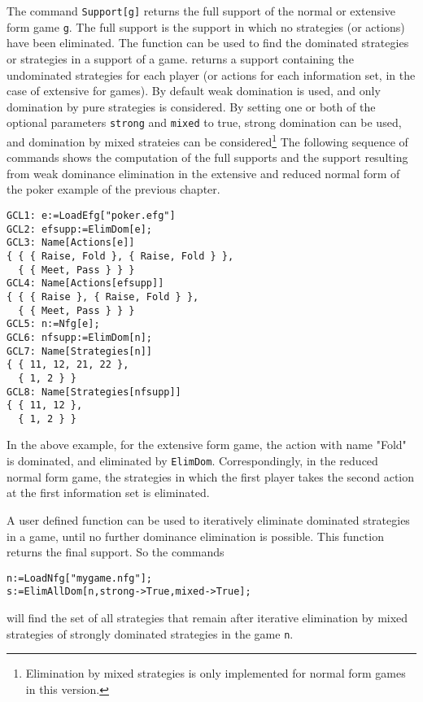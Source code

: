 The command \verb+Support[g]+ returns the full support
of the normal or extensive form game \verb+g+.  The full support is
the support in which no strategies (or actions) have been eliminated.
The function  can be used to find the dominated
strategies or strategies in a support of a game.  
returns a support containing the undominated strategies for each
player (or actions for each information set, in the case of extensive
for games).  By default weak domination is used, and only domination
by pure strategies is considered. By setting one or both of the
optional parameters \verb+strong+ and \verb+mixed+ to true, strong
domination can be used, and domination by mixed strateies can be
considered\footnote{Elimination by mixed strategies is only
implemented for normal form games in this version.}  The following
sequence of commands shows the computation of the full supports and
the support resulting from weak dominance elimination in the extensive
and reduced normal form of the poker example of the previous chapter.

\begin{verbatim}
GCL1: e:=LoadEfg["poker.efg"]
GCL2: efsupp:=ElimDom[e];
GCL3: Name[Actions[e]]
{ { { Raise, Fold }, { Raise, Fold } },
  { { Meet, Pass } } }
GCL4: Name[Actions[efsupp]]
{ { { Raise }, { Raise, Fold } },
  { { Meet, Pass } } }
GCL5: n:=Nfg[e];
GCL6: nfsupp:=ElimDom[n];
GCL7: Name[Strategies[n]]
{ { 11, 12, 21, 22 },
  { 1, 2 } }
GCL8: Name[Strategies[nfsupp]]
{ { 11, 12 },
  { 1, 2 } }
\end{verbatim}

In the above example, for the extensive form game, the action with
name "Fold" is dominated, and eliminated by \verb+ElimDom+.
Correspondingly, in the reduced normal form game, the strategies in
which the first player takes the second action at the first
information set is eliminated.  

A user defined function  can be used to iteratively
eliminate dominated strategies in a game, until no further dominance
elimination is possible.  This function returns the final support.  So
the commands

\begin{verbatim}
n:=LoadNfg["mygame.nfg"];
s:=ElimAllDom[n,strong->True,mixed->True];
\end{verbatim}

will find the set of all strategies that remain after iterative
elimination by mixed strategies of strongly dominated strategies in
the game \verb+n+.

